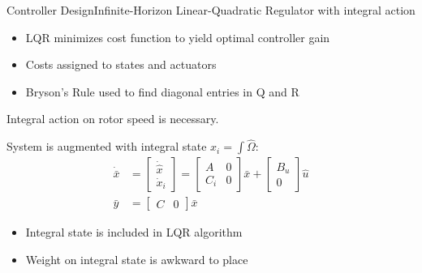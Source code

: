 \begin{frame}{Controller Design}{Infinite-Horizon Linear-Quadratic Regulator with integral action}
	\begin{itemize}
		\item LQR minimizes cost function to yield optimal controller gain
		\item Costs assigned to states and actuators
		\item Bryson's Rule used to find diagonal entries in Q and R
	\end{itemize}
	
	Integral action on rotor speed is necessary.

	\smallskip
	System is augmented with integral state $ x_i = \int \hat \Omega$:
	\begin{align} 
		\dot {\bar x} & = \begin{bmatrix} \dot{\hat x} \\ \dot x_i \end{bmatrix} = \begin{bmatrix} A &0 \\ C_{i} & 0 \end{bmatrix} \bar x + \begin{bmatrix} B_u \\ 0 \end{bmatrix}  \hat u \\
		\bar y & = \begin{bmatrix} C & 0 \end{bmatrix} \bar x
	\end{align}
	
	\begin{itemize}
		\item Integral state is included in LQR algorithm
		\item Weight on integral state is awkward to place
	\end{itemize}
\end{frame}


